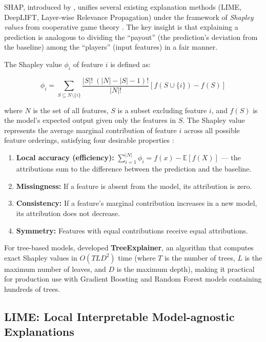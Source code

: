 \documentclass[12pt,a4paper]{report}
\begin{document}
SHAP, introduced by \citet{lundberg2017unified}, unifies several existing explanation methods (LIME, DeepLIFT, Layer-wise Relevance Propagation) under the framework of \textit{Shapley values} from cooperative game theory \citep{shapley1953value}. The key insight is that explaining a prediction is analogous to dividing the ``payout'' (the prediction's deviation from the baseline) among the ``players'' (input features) in a fair manner.

The Shapley value $\phi_i$ of feature $i$ is defined as:

\begin{equation}
\phi_i = \sum_{S \subseteq N \setminus \{i\}} \frac{|S|! \; (|N| - |S| - 1)!}{|N|!} \left[ f(S \cup \{i\}) - f(S) \right]
\label{eq:shapley}
\end{equation}

\noindent where $N$ is the set of all features, $S$ is a subset excluding feature $i$, and $f(S)$ is the model's expected output given only the features in $S$. The Shapley value represents the average marginal contribution of feature $i$ across all possible feature orderings, satisfying four desirable properties \citep{lundberg2017unified}:

\begin{enumerate}[label=\arabic*.]
  \item \textbf{Local accuracy (efficiency):} $\sum_{i=1}^{|N|} \phi_i = f(x) - \mathbb{E}[f(X)]$ --- the attributions sum to the difference between the prediction and the baseline.
  \item \textbf{Missingness:} If a feature is absent from the model, its attribution is zero.
  \item \textbf{Consistency:} If a feature's marginal contribution increases in a new model, its attribution does not decrease.
  \item \textbf{Symmetry:} Features with equal contributions receive equal attributions.
\end{enumerate}

For tree-based models, \citet{lundberg2020local} developed \textbf{TreeExplainer}, an algorithm that computes exact Shapley values in $O(TLD^2)$ time (where $T$ is the number of trees, $L$ is the maximum number of leaves, and $D$ is the maximum depth), making it practical for production use with Gradient Boosting and Random Forest models containing hundreds of trees.

\subsection{LIME: Local Interpretable Model-agnostic Explanations}
\end{document}
